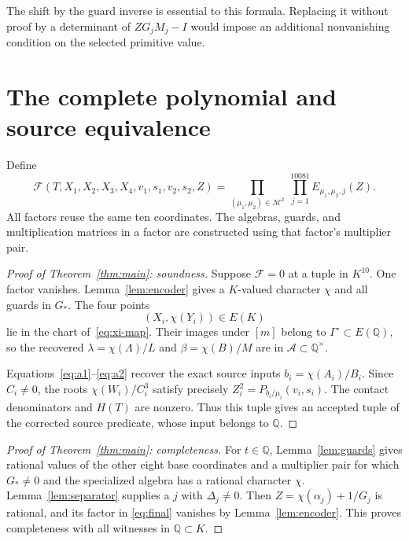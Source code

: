 \documentclass[11pt,a4paper]{article}
\newcommand{\Q}{\mathbb Q}\newcommand{\Z}{\mathbb Z}
\begin{document}
The shift by the guard inverse is essential to this formula. Replacing
it without proof by a determinant of \(ZG_jM_j-I\) would impose an
additional nonvanishing condition on the selected primitive value.

\section{The complete polynomial and source equivalence}

Define
\begin{equation}\label{eq:final}
 \mathcal F(T,X_1,X_2,X_3,X_4,v_1,s_1,v_2,s_2,Z)
  =\prod_{(\mu_1,\mu_2)\in\mathcal M^2}
       \ \prod_{j=1}^{10081}E_{\mu_1,\mu_2,j}(Z).
\end{equation}
All factors reuse the same ten coordinates. The algebras, guards,
and multiplication matrices in a factor are constructed using that
factor's multiplier pair.

\begin{proof}[Proof of Theorem~\ref{thm:main}: soundness]
Suppose \(\mathcal F=0\) at a tuple in \(K^{10}\). One factor vanishes.
Lemma~\ref{lem:encoder} gives a \(K\)-valued character \(\chi\) and
all guards in \(G_*\). The four points
\[
                       (X_i,\chi(Y_i))\in E(K)
\]
lie in the chart of~\eqref{eq:xi-map}. Their images under \([m]\)
belong to \(\Gamma^\circ\subset E(\Q)\), so the recovered
\(\lambda=\chi(\Lambda)/L\) and \(\beta=\chi(B)/M\) are in
\(\mathcal A\subset\Q^\times\).

Equations~\eqref{eq:a1}--\eqref{eq:a2} recover the exact source inputs
\(b_i=\chi(A_i)/B_i\). Since \(C_i\ne0\), the roots
\(\chi(W_i)/C_i^3\) satisfy precisely
\(Z_i^2=P_{b_i/\mu_i}(v_i,s_i)\).
The contact denominators and \(H(T)\) are nonzero. Thus this tuple
gives an accepted tuple of the corrected source predicate, whose
input belongs to \(\Q\).
\end{proof}

\begin{proof}[Proof of Theorem~\ref{thm:main}: completeness]
For \(t\in\Q\), Lemma~\ref{lem:guards} gives rational values of the
other eight base coordinates and a multiplier pair for which \(G_*\ne0\)
and the specialized algebra has a rational character \(\chi\).
Lemma~\ref{lem:separator} supplies a \(j\) with \(\Delta_j\ne0\).
Then \(Z=\chi(\alpha_j)+1/G_j\) is rational, and its factor in
\eqref{eq:final} vanishes by Lemma~\ref{lem:encoder}.
This proves completeness with all witnesses in \(\Q\subset K\).
\end{proof}
\end{document}
